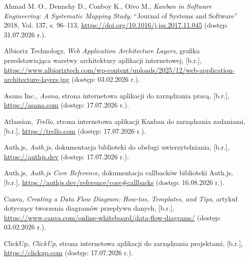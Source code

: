 \documentclass[12pt,a4paper,twoside]{report}
\begin{document}
\begin{list}{}{\setlength{\leftmargin}{0pt}\setlength{\itemindent}{0pt}\setlength{\labelwidth}{0pt}\setlength{\labelsep}{0pt}\setlength{\itemsep}{0.5\baselineskip}}

\item {\RaggedRight Ahmad M. O., Dennehy D., Conboy K., Oivo M., \emph{Kanban in Software Engineering: A Systematic Mapping Study}, ``Journal of Systems and Software'' 2018, Vol. 137, s. 96--113, \url{https://doi.org/10.1016/j.jss.2017.11.045} (dostęp: 31.07.2026 r.).\par}

\item {\RaggedRight Albiorix Technology, \emph{Web Application Architecture Layers}, grafika przedstawiająca warstwy architektury aplikacji internetowej, [b.r.], \url{https://www.albiorixtech.com/wp-content/uploads/2025/12/web-application-architecture-layers.jpg} (dostęp: 03.02.2026 r.).\par}

\item {\RaggedRight Asana Inc., \emph{Asana}, strona internetowa aplikacji do zarządzania pracą, [b.r.], \url{https://asana.com} (dostęp: 17.07.2026 r.).\par}

\item {\RaggedRight Atlassian, \emph{Trello}, strona internetowa aplikacji Kanban do zarządzania zadaniami, [b.r.], \url{https://trello.com} (dostęp: 17.07.2026 r.).\par}

\item {\RaggedRight Auth.js, \emph{Auth.js}, dokumentacja biblioteki do obsługi uwierzytelniania, [b.r.], \url{https://authjs.dev} (dostęp: 17.07.2026 r.).\par}

\item {\RaggedRight Auth.js, \emph{Auth.js Core Reference}, dokumentacja callbacków biblioteki Auth.js, [b.r.], \url{https://authjs.dev/reference/core\#callbacks} (dostęp: 16.08.2026 r.).\par}

\item {\RaggedRight Canva, \emph{Creating a Data Flow Diagram: How-tos, Templates, and Tips}, artykuł dotyczący tworzenia diagramów przepływu danych, [b.r.], \url{https://www.canva.com/online-whiteboard/data-flow-diagrams/} (dostęp: 03.02.2026 r.).\par}

\item {\RaggedRight ClickUp, \emph{ClickUp}, strona internetowa aplikacji do zarządzania projektami, [b.r.], \url{https://clickup.com} (dostęp: 17.07.2026 r.).\par}


\end{list}
\end{document}
